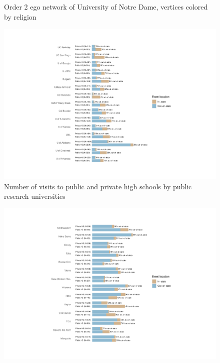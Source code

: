 \documentclass[
  12pt,
]{article}
\begin{document}
\begin{landscape}
\begin{figure}
{}

\caption{Order 2 ego network of University of Notre Dame, vertices colored by religion}\label{fig:nd-religion}
\end{figure}

\newpage

\begin{figure}

{\centering \includegraphics[width=2\linewidth]{./events_hs_count_pubu} 

}

\caption{Number of visits to public and private high schools by public research universities}\label{fig:events-hs-count-pubu}
\end{figure}

\newpage

\begin{figure}

{\centering \includegraphics[width=2\linewidth]{./events_hs_count_privu} 

}
\end{figure}
\end{landscape}
\end{document}
